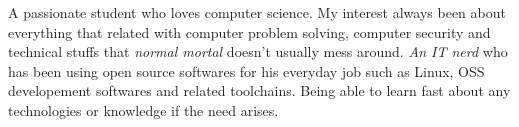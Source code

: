 

\begin{cvparagraph}

A passionate student who loves computer science. My interest always been about everything that related with computer problem solving, computer security and technical stuffs that \textit{normal mortal} doesn't usually mess around. \textit{An IT nerd} who has been using open source softwares for his everyday job such as Linux, OSS developement softwares and related toolchains. Being able to learn fast about any technologies or knowledge if the need arises.
\end{cvparagraph}